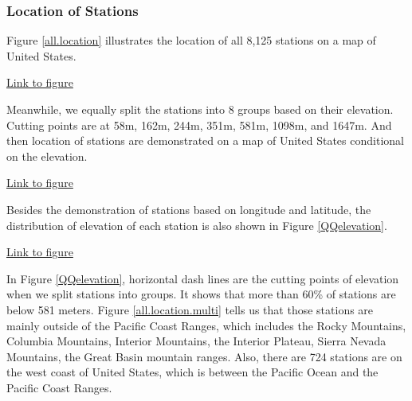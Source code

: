 \subsubsection{Location of Stations}

Figure \href{../plots/allstationsone.pdf}{\ref*{all.location}} illustrates the
location of all 8,125 stations on a map of United States.

\begin{framed}
\begin{center}
  \href{../plots/allstationsone.pdf}{Link to figure}
  \label{all.location}
\end{center}
\end{framed}

Meanwhile, we equally split the stations into 8 groups based on their elevation. 
Cutting points are at 58m, 162m, 244m, 351m, 581m, 1098m, and 1647m. And 
then location of stations are demonstrated on a map of United States conditional 
on the elevation.

\begin{framed}
\begin{center}
  \href{../plots/allstations.pdf}{Link to figure}
  \label{all.location.multi}
\end{center}
\end{framed}

Besides the demonstration of stations based on longitude and latitude, the 
distribution of elevation of each station is also shown in Figure 
\href{../plots/QQelevation.pdf}{\ref*{QQelevation}}.

\begin{framed}
\begin{center}
  \href{../plots/QQelevation.pdf}{Link to figure}
  \label{QQelevation}
\end{center}
\end{framed}

In Figure \href{../plots/QQelevation.pdf}{\ref*{QQelevation}}, horizontal dash 
lines are the cutting points of elevation when we split stations into groups. 
It shows that more than
60\% of stations are below 581 meters. Figure 
\href{../plots/allstations.pdf}{\ref*{all.location.multi}} tells us that those 
stations are mainly outside of the 
Pacific Coast Ranges, which includes the Rocky Mountains, Columbia Mountains, 
Interior Mountains, the Interior Plateau, Sierra Nevada Mountains, the Great 
Basin mountain ranges. Also, there are 724 stations are on the west coast of 
United States, which is between the Pacific Ocean and the Pacific Coast Ranges.


